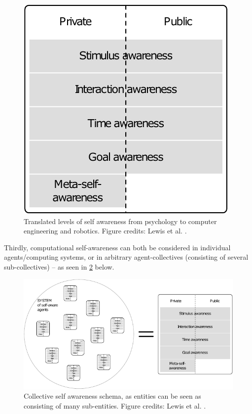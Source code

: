 	\begin{figure}[!htp]
		\centering
		\includegraphics[width=0.5\columnwidth]{Assets/DocSegments/Chapters/Background/Figures/Schema/SA_levels.pdf}
		\caption[Translated levels of self awareness from psychology to computer engineering and robotics.]{Translated levels of self awareness from psychology to computer engineering and robotics. Figure credits: Lewis et al. \cite{sacs16_ch2}.}
		\label{fig:comp_SA_levels}
	\end{figure}

	Thirdly, computational self-awareness can both be considered in individual agents/computing systems, or in arbitrary agent-collectives (consisting of several sub-collectives) -- as seen in \ref{fig:collective_SA} below.

	\begin{figure}[!htp]
		\centering
		\includegraphics[width=\columnwidth]{Assets/DocSegments/Chapters/Background/Figures/Schema/collective_SA.pdf}
		\caption[Collective self awareness schema.]{Collective self awareness schema, as entities can be seen as consisting of many sub-entities. Figure credits: Lewis et al. \cite{sacs16_ch2}.}
		\label{fig:collective_SA}
	\end{figure}

